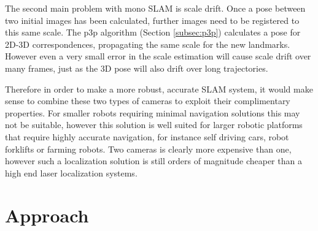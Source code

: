 The second main problem with mono SLAM is scale drift.  Once a pose between two initial images has been calculated, further images need to be registered to this same scale.  The p3p algorithm (Section \ref{subsec:p3p}) calculates a pose for 2D-3D correspondences, propagating the same scale for the new landmarks.  However even a very small error in the scale estimation will cause scale drift over many frames, just as the 3D pose will also drift over long trajectories.

Therefore in order to make a more robust, accurate SLAM system, it would make sense to combine these two types of cameras to exploit their complimentary properties.  For smaller robots requiring minimal navigation solutions this may not be suitable, however this solution is well suited for larger robotic platforms that require highly accurate navigation, for instance self driving cars, robot forklifts or farming robots.  Two cameras is clearly more expensive than one, however such a localization solution is still orders of magnitude cheaper than a high end laser localization systems.

  

\section{Approach}


